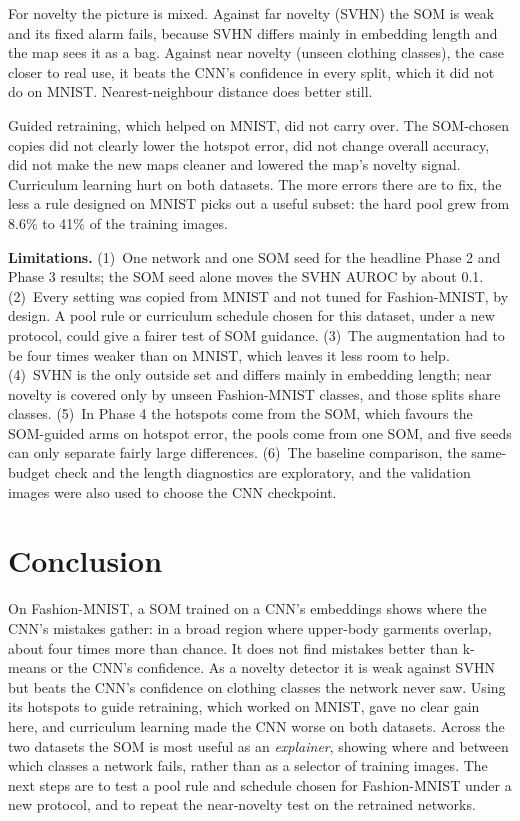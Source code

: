 \documentclass[11pt]{article}
\begin{document}
For novelty the picture is mixed. Against far novelty (SVHN) the SOM is weak and its fixed alarm fails, because SVHN differs mainly in embedding length and the map sees it as a bag. Against near novelty (unseen clothing classes), the case closer to real use, it beats the CNN's confidence in every split, which it did not do on MNIST. Nearest-neighbour distance does better still.

Guided retraining, which helped on MNIST, did not carry over. The SOM-chosen copies did not clearly lower the hotspot error, did not change overall accuracy, did not make the new maps cleaner and lowered the map's novelty signal. Curriculum learning hurt on both datasets. The more errors there are to fix, the less a rule designed on MNIST picks out a useful subset: the hard pool grew from 8.6\% to 41\% of the training images.

\textbf{Limitations.}
(1)~One network and one SOM seed for the headline Phase 2 and Phase 3 results; the SOM seed alone moves the SVHN AUROC by about 0.1.
(2)~Every setting was copied from MNIST and not tuned for Fashion-MNIST, by design. A pool rule or curriculum schedule chosen for this dataset, under a new protocol, could give a fairer test of SOM guidance.
(3)~The augmentation had to be four times weaker than on MNIST, which leaves it less room to help.
(4)~SVHN is the only outside set and differs mainly in embedding length; near novelty is covered only by unseen Fashion-MNIST classes, and those splits share classes.
(5)~In Phase 4 the hotspots come from the SOM, which favours the SOM-guided arms on hotspot error, the pools come from one SOM, and five seeds can only separate fairly large differences.
(6)~The baseline comparison, the same-budget check and the length diagnostics are exploratory, and the validation images were also used to choose the CNN checkpoint.

\section{Conclusion}

On Fashion-MNIST, a SOM trained on a CNN's embeddings shows where the CNN's mistakes gather: in a broad region where upper-body garments overlap, about four times more than chance. It does not find mistakes better than k-means or the CNN's confidence. As a novelty detector it is weak against SVHN but beats the CNN's confidence on clothing classes the network never saw.
Using its hotspots to guide retraining, which worked on MNIST, gave no clear gain here, and curriculum learning made the CNN worse on both datasets. Across the two datasets the SOM is most useful as an \emph{explainer}, showing where and between which classes a network fails, rather than as a selector of training images.
The next steps are to test a pool rule and schedule chosen for Fashion-MNIST under a new protocol, and to repeat the near-novelty test on the retrained networks.

\clearpage
\printbibliography[title={References}]
\end{document}
